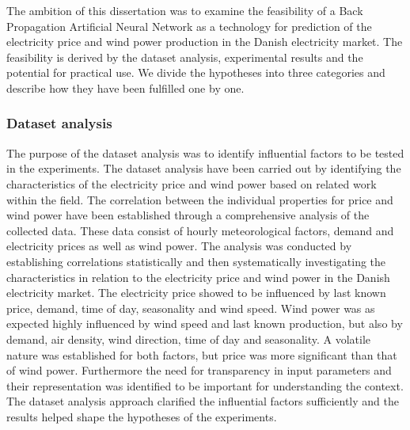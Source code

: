 The ambition of this dissertation was to examine the feasibility of a Back Propagation Artificial Neural Network as a technology for prediction of the electricity price and wind power production in the Danish electricity market. The feasibility is derived by the dataset analysis, experimental results and the potential for practical use. We divide the hypotheses into three categories and describe how they have been fulfilled one by one.

\subsubsection{Dataset analysis}
The purpose of the dataset analysis was to identify influential factors to be tested in the experiments. The dataset analysis have been carried out by identifying the characteristics of the electricity price and wind power based on related work within the field. The correlation between the individual properties for price and wind power have been established through a comprehensive analysis of the collected data. These data consist of hourly meteorological factors, demand and electricity prices as well as wind power. The analysis was conducted by establishing correlations statistically and then systematically investigating the characteristics in relation to the electricity price and wind power in the Danish electricity market. The electricity price showed to be influenced by last known price, demand, time of day, seasonality and wind speed. Wind power was as expected highly influenced by wind speed and last known production, but also by demand, air density, wind direction, time of day and seasonality. A volatile nature was established for both factors, but price was more significant than that of wind power. Furthermore the need for transparency in input parameters and their representation was identified to be important for understanding the context. The dataset analysis approach clarified the influential factors sufficiently and the results helped shape the hypotheses of the experiments. 
